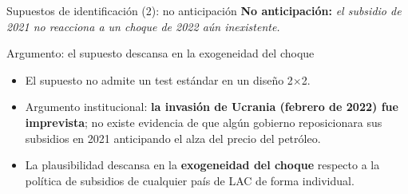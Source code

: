 \documentclass[aspectratio=169,10pt]{beamer}
\begin{document}
\begin{frame}{Supuestos de identificación (2): no anticipación}
  \textbf{No anticipación:} \emph{el subsidio de 2021 no reacciona a un choque de 2022 aún inexistente.}

  \begin{block}{Argumento: el supuesto descansa en la exogeneidad del choque}
    \begin{itemize}
      \item El supuesto no admite un test estándar en un diseño 2$\times$2.
      \item Argumento institucional: \textbf{la invasión de Ucrania (febrero de 2022) fue
            imprevista}; no existe evidencia de que algún gobierno reposicionara sus
            subsidios en 2021 anticipando el alza del precio del petróleo.
      \item La plausibilidad descansa en la \textbf{exogeneidad del choque} respecto
            a la política de subsidios de cualquier país de LAC de forma individual.
    \end{itemize}
  \end{block}

\end{frame}
\end{document}
